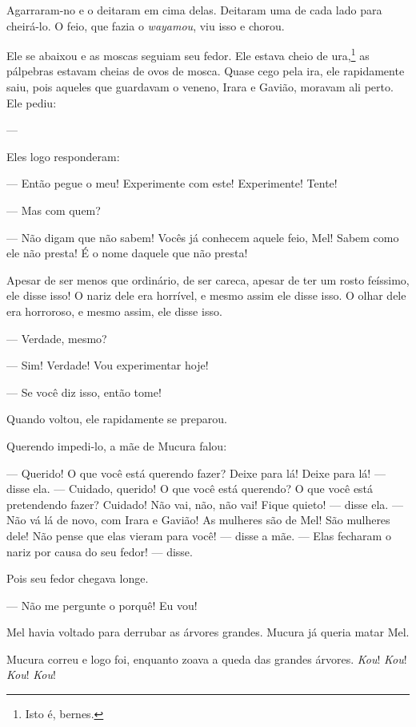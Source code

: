Agarraram-no e o deitaram em cima delas. Deitaram uma de cada lado para
cheirá-lo. O feio, que fazia o \textit{wayamou}, viu isso e
chorou. 

Ele se abaixou e as moscas seguiam seu fedor. Ele estava cheio de
 ura,\footnote{Isto é, bernes.} as pálpebras estavam cheias de ovos de mosca.
 Quase cego pela ira, ele rapidamente saiu, pois aqueles que guardavam o
 veneno, Irara e Gavião, moravam ali perto. Ele pediu: 

---  

Eles logo responderam:

--- Então pegue o meu! Experimente com este! Experimente! Tente!

--- Mas com quem? 

--- Não digam que não sabem! Vocês já conhecem aquele feio, Mel! Sabem
 como ele não presta! É o nome daquele que não presta!

Apesar de ser menos que ordinário, de ser careca, apesar de ter um rosto
 feíssimo, ele disse isso! O nariz dele era horrível, e mesmo assim ele
 disse isso. O olhar dele era horroroso, e mesmo assim, ele disse isso. 

--- Verdade, mesmo? 

--- Sim! Verdade! Vou experimentar hoje!

--- Se você diz isso, então tome! 

Quando voltou, ele rapidamente se preparou. 

Querendo impedi-lo, a mãe de Mucura falou: 

--- Querido! O que você está querendo fazer? Deixe para lá! Deixe para
lá! --- disse ela. --- Cuidado, querido! O que você está querendo? O que
você está pretendendo fazer? Cuidado! Não vai, não, não vai! Fique
quieto! --- disse ela. --- Não vá lá de novo, com Irara e Gavião! As
mulheres são de Mel! São mulheres dele! Não pense que elas vieram para você!
--- disse a mãe. --- Elas fecharam o nariz por causa do seu fedor!
--- disse.

Pois seu fedor chegava longe.

--- Não me pergunte o porquê! Eu vou! 

Mel havia voltado para derrubar as árvores grandes. Mucura já queria matar
Mel. 

Mucura correu e logo foi, enquanto zoava a queda das grandes
árvores. \textit{Kou}! \textit{Kou}! \textit{Kou}! \textit{Kou}! 


